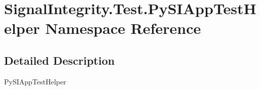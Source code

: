 \hypertarget{namespaceSignalIntegrity_1_1Test_1_1PySIAppTestHelper}{}\section{Signal\+Integrity.\+Test.\+Py\+S\+I\+App\+Test\+Helper Namespace Reference}
\label{namespaceSignalIntegrity_1_1Test_1_1PySIAppTestHelper}


\subsection{Detailed Description}
\begin{DoxyVerb}PySIAppTestHelper\end{DoxyVerb}
 